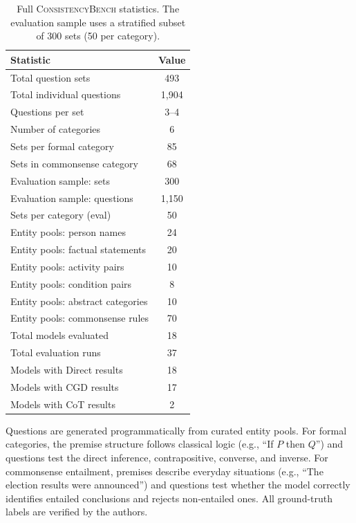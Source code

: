 \documentclass{article}
\newcommand{\bench}{\textsc{ConsistencyBench}}
\begin{document}
\begin{table}[ht]
\caption{Full \bench{} statistics. The evaluation sample uses a stratified subset of 300 sets (50 per category).}
\label{tab:benchstats}
\begin{center}
\small
\begin{tabular}{lc}
\toprule
\textbf{Statistic} & \textbf{Value} \\
\midrule
Total question sets & 493 \\
Total individual questions & 1,904 \\
Questions per set & 3--4 \\
Number of categories & 6 \\
Sets per formal category & 85 \\
Sets in commonsense category & 68 \\
\midrule
Evaluation sample: sets & 300 \\
Evaluation sample: questions & 1,150 \\
Sets per category (eval) & 50 \\
\midrule
Entity pools: person names & 24 \\
Entity pools: factual statements & 20 \\
Entity pools: activity pairs & 10 \\
Entity pools: condition pairs & 8 \\
Entity pools: abstract categories & 10 \\
Entity pools: commonsense rules & 70 \\
\midrule
Total models evaluated & 18 \\
Total evaluation runs & 37 \\
Models with Direct results & 18 \\
Models with CGD results & 17 \\
Models with CoT results & 2 \\
\bottomrule
\end{tabular}
\end{center}
\end{table}

Questions are generated programmatically from curated entity pools. For formal categories, the premise structure follows classical logic (e.g., ``If $P$ then $Q$'') and questions test the direct inference, contrapositive, converse, and inverse. For commonsense entailment, premises describe everyday situations (e.g., ``The election results were announced'') and questions test whether the model correctly identifies entailed conclusions and rejects non-entailed ones. All ground-truth labels are verified by the authors.
\end{document}
